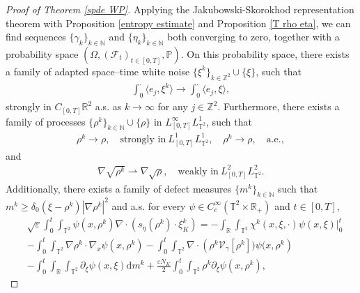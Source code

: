 \begin{proof}[Proof of Theorem \ref{spde WP}]
Applying the Jakubowski-Skorokhod representation theorem \cite{} with Proposition \ref{entropy estimate} and Proposition \ref{T rho eta}, we can find sequences $\{\gamma_k\}_{k \in \mathbb{N}}$ and $\{\eta_k\}_{k \in \mathbb{N}}$ both converging to zero, together with a probability space $(\Omega, (\mathcal{F}_t)_{t \in [0,T]}, \mathbb{P})$. On this probability space, there exists a family of adapted space--time white noise $\{\xi^k\}_{k \in \mathbb{Z}^2} \cup \{\xi\}$, such that 
\begin{align}
\int_0^{\cdot} \langle e_j, \xi^k \rangle \to \int_0^{\cdot} \langle e_j, \xi \rangle, 
\end{align}
strongly in $C_{[0,T]}\mathbb{R}^2$ a.s. as $k \to \infty$ for any $j \in \mathbb{Z}^2$. Furthermore, there exists a family of processes $\{\rho^{k}\}_{k \in \mathbb{N}} \cup \{\rho\}$ in $L^{\infty}_{[0,T]}L^1_{\mathbb{T}^2}$, such that 
\begin{align}\label{eq:strong-L1-convergence}
\rho^{k} \to \rho,\quad \text{strongly in} \ L^1_{[0,T]}L^1_{\mathbb{T}^2}, \quad \rho^{k} \to \rho, \quad \text{a.e.},
\end{align}
and
\begin{align}\label{eq:weak-grad-square-convergence}
\nabla\sqrt{\rho^{k}} \rightharpoonup \nabla\sqrt{\rho}, \quad \text{weakly in} \ L^2_{[0,T]}L^2_{\mathbb{T}^2}.
\end{align}
Additionally, there exists a family of defect measures $\{m^{k}\}_{k \in \mathbb{N}}$ such that $m^{k} \geq \delta_0(\xi - \rho^{k}) |\nabla \rho^{k}|^2$ and a.s. for every $\psi \in C_c^{\infty}(\mathbb{T}^2 \times \mathbb{R}_+)$ and $t \in [0,T]$, 
\begin{align}\label{WKS-k}
&\sqrt{\varepsilon}\int_0^t \int_{\mathbb{T}^2} \psi\left(x, \rho^k\right) \nabla \cdot\left(s_{\eta}(\rho^k) \cdot \xi^k_{K}\right)  =-\int_{\mathbb{R}}\int_{\mathbb{T}^2} \chi^k(x, \xi, \cdot) \psi(x, \xi) \Big|^t_0 \nonumber\\
&-\int_{0}^{t} \int_{\mathbb{T}^2}\nabla\rho^k\cdot\nabla_x\psi(x,\rho^k)
-\int_{0}^{t} \int_{\mathbb{T}^2} \nabla\cdot\left(\rho^k \mathcal{V}_{\gamma}[\rho^k])\psi(x, \rho^k\right)\nonumber\\
&-\int_{0}^{t} \int_{\mathbb{R}} \int_{\mathbb{T}^2} \partial_{\xi} \psi(x, \xi) \mathrm{d}m^k
+\frac{\varepsilon N_K}{2}\int_{0}^{t} \int_{\mathbb{T}^2}\rho^k \partial_{\xi} \psi(x, \rho^k),
\end{align}

\end{proof}
